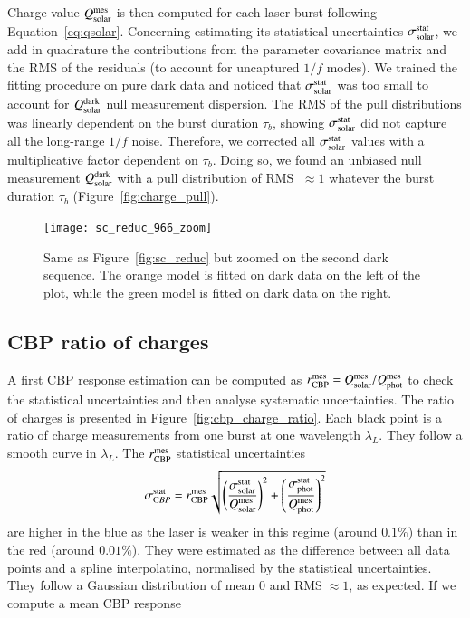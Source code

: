 Charge value $Q_{\mathrm{solar}}^{\mathrm{mes}}$ is then computed for each laser burst following Equation~\ref{eq:qsolar}. Concerning estimating its statistical uncertainties $\sigma_{\mathrm{solar}}^{\mathrm{stat}}$, we add in quadrature the contributions from the parameter covariance matrix and the RMS of the residuals (to account for uncaptured $1/f$ modes). We trained the fitting procedure on pure dark data and noticed that $\sigma_{\mathrm{solar}}^{\mathrm{stat}}$ was too small to account for $Q_{\mathrm{solar}}^{\rm dark}$ null measurement dispersion. The RMS of the pull distributions was linearly dependent on the burst duration $\tau_b$, showing $\sigma_{\mathrm{solar}}^{\mathrm{stat}}$ did not capture all the long-range $1/f$ noise. Therefore, we corrected all $\sigma_{\mathrm{solar}}^{\mathrm{stat}}$ values with a multiplicative factor dependent on $\tau_b$. Doing so, we found an unbiased null measurement $Q_{\mathrm{solar}}^{\rm dark}$ with a pull distribution of RMS $\;\approx 1$ whatever the burst duration $\tau_b$ (Figure~\ref{fig:charge_pull}). 

\begin{figure}[!h]
\centering
\texttt{[image: sc\_reduc\_966\_zoom]}
\caption{Same as Figure~\ref{fig:sc_reduc} but zoomed on the second dark sequence. The orange model is fitted on dark data on the left of the plot, while the green model is fitted on dark data on the right.}\label{fig:sc_reduc_zoom}
\end{figure}


\subsection{CBP ratio of charges}

A first CBP response estimation can be computed as $r_{\rm CBP}^{\rm mes} = Q_{\mathrm{solar}}^{\mathrm{mes}}/Q_{\mathrm{phot}}^{\mathrm{mes}}$ to check the statistical uncertainties and then analyse systematic uncertainties. The ratio of charges is presented in Figure~\ref{fig:cbp_charge_ratio}. Each black point is a ratio of charge measurements from one burst at one wavelength $\lambda_L$. They follow a smooth curve in $\lambda_L$. The $r_{\rm CBP}^{\rm mes}$ statistical uncertainties 
\begin{equation}
    \sigma_{\mathrm CBP}^{\rm stat} = r_{\rm CBP}^{\rm mes} \sqrt{\left(\frac{\sigma_{\mathrm{solar}}^{\mathrm{stat}}}{Q_{\mathrm{solar}}^{\mathrm{mes}}}\right)^2 +  \left(\frac{\sigma_{\mathrm{phot}}^{\mathrm{stat}}}{Q_{\mathrm{phot}}^{\mathrm{mes}}}\right)^2 }
\end{equation}
are higher in the blue as the laser is weaker in this regime (around $0.1\%$) than in the red (around $0.01\%$). They were estimated as the difference between all data points and a spline interpolatino, normalised by the statistical uncertainties. They follow a Gaussian distribution of mean 0 and RMS$\;\approx 1$, as expected. If we compute a mean CBP response

